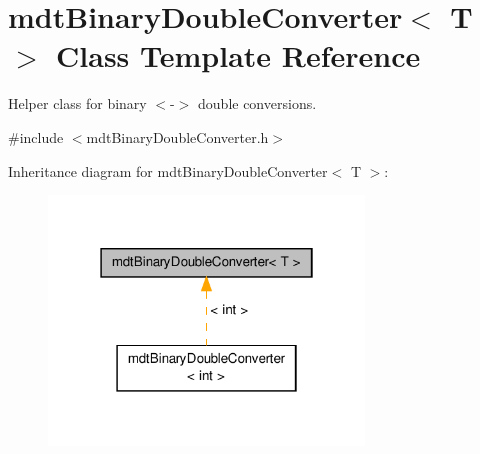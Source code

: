 \hypertarget{classmdt_binary_double_converter}{\section{mdt\-Binary\-Double\-Converter$<$ T $>$ Class Template Reference}
\label{classmdt_binary_double_converter}
}


Helper class for binary $<$-\/$>$ double conversions.  




{\ttfamily \#include $<$mdt\-Binary\-Double\-Converter.\-h$>$}



Inheritance diagram for mdt\-Binary\-Double\-Converter$<$ T $>$\-:
\nopagebreak
\begin{figure}[H]
\begin{center}
\leavevmode
\includegraphics[width=238pt]{classmdt_binary_double_converter__inherit__graph}
\end{center}
\end{figure}
